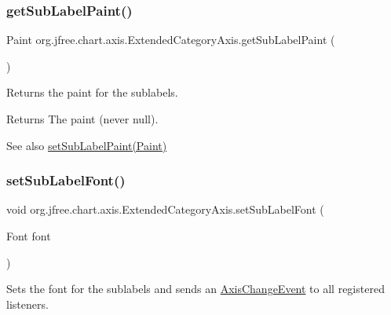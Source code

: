 \subsubsection{\texorpdfstring{get\+Sub\+Label\+Paint()}{getSubLabelPaint()}}
{\footnotesize\ttfamily Paint org.\+jfree.\+chart.\+axis.\+Extended\+Category\+Axis.\+get\+Sub\+Label\+Paint (\begin{DoxyParamCaption}{ }\end{DoxyParamCaption})}

Returns the paint for the sublabels.

\begin{DoxyReturn}{Returns}
The paint (never {\ttfamily null}).
\end{DoxyReturn}
\begin{DoxySeeAlso}{See also}
\mbox{\hyperlink{classorg_1_1jfree_1_1chart_1_1axis_1_1_extended_category_axis_a25d5fdb730377e92220fbd36cc4f274d}{set\+Sub\+Label\+Paint(\+Paint)}} 
\end{DoxySeeAlso}
\mbox{\label{classorg_1_1jfree_1_1chart_1_1axis_1_1_extended_category_axis_aaaa091e9b6e36820bbae9783a54746f5}} 
\subsubsection{\texorpdfstring{set\+Sub\+Label\+Font()}{setSubLabelFont()}}
{\footnotesize\ttfamily void org.\+jfree.\+chart.\+axis.\+Extended\+Category\+Axis.\+set\+Sub\+Label\+Font (\begin{DoxyParamCaption}\item[{Font}]{font }\end{DoxyParamCaption})}

Sets the font for the sublabels and sends an \mbox{\hyperlink{}{Axis\+Change\+Event}} to all registered listeners.



